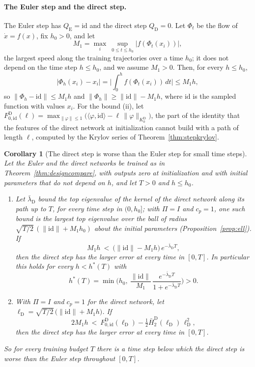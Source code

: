 \documentclass[11pt]{article}
\newtheorem{corollary}{Corollary}
\theoremstyle{definition}
\theoremstyle{remark}
\newcommand{\id}{\mathrm{id}}
\newcommand{\ip}[2]{\langle #1,#2\rangle}
\begin{document}
\paragraph{The Euler step and the direct step.}
The Euler step has $Q_{\mathrm E} = \id$ and the direct step $Q_{\mathrm D} = 0$.
Let $\Phi_t$ be the flow of $\dot x = f(x)$, fix $h_0 > 0$, and let
\[
M_1 = \max_i\ \sup_{0\le t\le h_0}\big|f(\Phi_t(x_i))\big| ,
\]
the largest speed along the training trajectories over a time $h_0$; it does not depend on the time step $h\le h_0$, and we assume $M_1 > 0$.
Then, for every $h\le h_0$,
\[
|\Phi_h(x_i) - x_i| = \Big|\int_0^hf(\Phi_t(x_i))\,dt\Big|\le M_1h ,
\]
so $\|\Phi_h - \id\|\le M_1h$ and $\|\Phi_h\|\ge\|\id\| - M_1h$, where $\id$ is the sampled function with values $x_i$.
For the bound (ii), let $F_{0,\id}^{\mathrm D}(\ell) = \max_{\|\varphi\|\le1}\big(\ip{\varphi}{\id} - \ell\,\|\varphi\|_{K_0^{\mathrm D}}\big)$, the part of the identity that the features of the direct network at initialization cannot build with a path of length $\ell$, computed by the Krylov series of Theorem~\ref{thm:stepkrylov}.

\begin{corollary}[The direct step is worse than the Euler step for small time steps]\label{cor:eulerdirect}
Let the Euler and the direct networks be trained as in Theorem~\ref{thm:designcompare}, with outputs zero at initialization and with initial parameters that do not depend on $h$, and let $T > 0$ and $h\le h_0$.
\begin{enumerate}[label=(\alph*)]
\item Let $\bar\lambda_{\mathrm D}$ bound the top eigenvalue of the kernel of the direct network along its path up to $T$, for every time step in $(0, h_0]$; with $\Pi = I$ and $c_p = 1$, one such bound is the largest top eigenvalue over the ball of radius $\sqrt{T/2}\,(\|\id\| + M_1h_0)$ about the initial parameters (Proposition~\ref{prop:ell}).
If
\begin{equation}\label{eq:EDexp}
M_1h\ <\ \big(\|\id\| - M_1h\big)\,e^{-\bar\lambda_{\mathrm D}T},
\end{equation}
then the direct step has the larger error at every time in $[0,T]$.
In particular this holds for every $h < h^\ast(T)$ with
\begin{equation}\label{eq:hstar}
h^\ast(T) = \min\Big(h_0,\ \frac{\|\id\|}{M_1}\,\frac{e^{-\bar\lambda_{\mathrm D}T}}{1 + e^{-\bar\lambda_{\mathrm D}T}}\Big) > 0 .
\end{equation}
\item With $\Pi = I$ and $c_p = 1$ for the direct network, let $\ell_{\mathrm D} = \sqrt{T/2}\,\big(\|\id\| + M_1h\big)$. If
\begin{equation}\label{eq:EDpath}
2M_1h\ <\ F_{0,\id}^{\mathrm D}(\ell_{\mathrm D}) - \tfrac12\bar H_2^{\mathrm D}(\ell_{\mathrm D})\,\ell_{\mathrm D}^2 ,
\end{equation}
then the direct step has the larger error at every time in $[0,T]$.
\end{enumerate}
So for every training budget $T$ there is a time step below which the direct step is worse than the Euler step throughout $[0,T]$.
\end{corollary}
\end{document}
